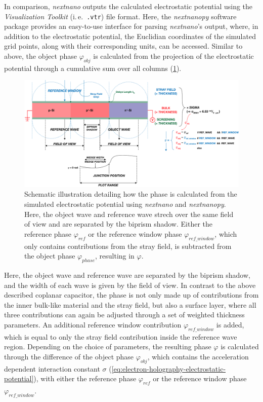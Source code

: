 In comparison, \emph{nextnano} outputs the calculated electrostatic potential using the \emph{Visualization Toolkit} (i.\,e.\ \texttt{.vtr}) file format. Here, the \emph{nextnanopy} software package \cite{nextnanopy} provides an easy-to-use interface for parsing \emph{nextnano}'s output, where, in addition to the electrostatic potential, the Euclidian coordinates of the simulated grid points, along with their corresponding units, can be accessed. Similar to above, the object phase $\varphi_{\mathit{obj}}$ is calculated from the projection of the electrostatic potential through a cumulative sum over all columns (\cref{fig:flowchart-automatic-nextnano-post-processing}).
\begin{figure}[H]
	\centering
	\includegraphics[width=\textwidth]{Figures/Schematics/Automation/flowchart-automatic-nextnano-post-processing.pdf}
	\caption{Schematic illustration detailing how the phase is calculated from the simulated electrostatic potential using \emph{nextnano} and \emph{nextnanopy}. Here, the object wave and reference wave strech over the same field of view and are separated by the biprism shadow. Either the reference phase $\varphi_{\mathit{ref}}$ or the reference window phase $\varphi_{\mathit{ref\_window}}$, which only contains contributions from the stray field, is subtracted from the object phase $\varphi_{\mathit{phase}}$, resulting in $\varphi$.}
	\label{fig:flowchart-automatic-nextnano-post-processing}
\end{figure}
Here, the object wave and reference wave are separated by the biprism shadow, and the width of each wave is given by the field of view. In contrast to the above described coplanar capacitor, the phase is not only made up of contributions from the inner bulk-like material and the stray field, but also a surface layer, where all three contributions can again be adjusted through a set of weighted thickness parameters. An additional reference window contribution $\varphi_{\mathit{ref\_window}}$ is added, which is equal to only the stray field contribution inside the reference wave region. Depending on the choice of parameters, the resulting phase $\varphi$ is calculated through the difference of the object phase $\varphi_{\mathit{obj}}$, which contains the acceleration dependent interaction constant $\sigma$ (\cref{eq:electron-holography-electrostatic-potential}), with either the reference phase $\varphi_{\mathit{ref}}$ or the reference window phase $\varphi_{\mathit{ref\_window}}$.
\newpage
